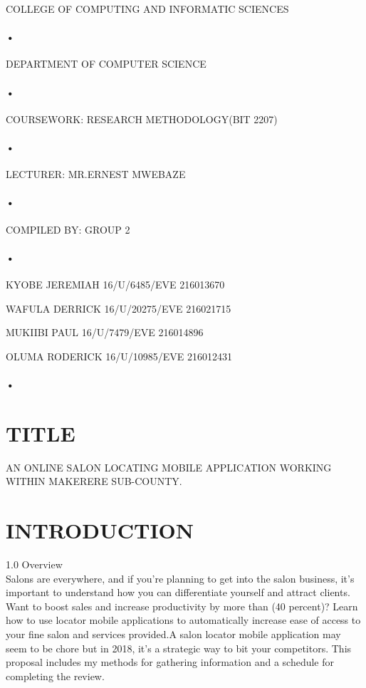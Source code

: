 \documentclass[11pt,A4paper]{article}
\begin{document}
\begin{titlepage}
  
\centerline{COLLEGE OF COMPUTING AND INFORMATIC SCIENCES}
\paragraph{•}
\centerline{DEPARTMENT OF COMPUTER SCIENCE\\}
\paragraph{•}

\centerline{COURSEWORK: RESEARCH METHODOLOGY(BIT 2207)\\}
\paragraph{•}

\centerline{LECTURER: MR.ERNEST MWEBAZE}

\paragraph{•}
\centerline{COMPILED BY:
 GROUP 2}
 \paragraph{•}
\centerline{KYOBE JEREMIAH   16/U/6485/EVE    216013670\\}
\centerline{WAFULA DERRICK    16/U/20275/EVE    216021715\\}
\centerline{MUKIIBI PAUL       16/U/7479/EVE     216014896\\}
\centerline{OLUMA  RODERICK   16/U/10985/EVE    216012431\\}

\paragraph{•}
\end{titlepage}
\tableofcontents
\newpage
{}
\section{TITLE}
AN ONLINE SALON LOCATING MOBILE APPLICATION WORKING WITHIN MAKERERE SUB-COUNTY.
\section{INTRODUCTION}
1.0	 Overview\\
Salons are everywhere, and if you're planning to get into the salon business, it's important to understand how you can differentiate yourself and attract clients. Want to boost sales and increase productivity by more than (40 percent)? Learn how to use locator mobile applications to automatically increase ease of access to your fine salon and services provided.A salon locator mobile application may seem to be chore but in 2018, it's a strategic way to bit your competitors. This proposal includes my methods for gathering information and a schedule for completing the review.
 
\end{document}
